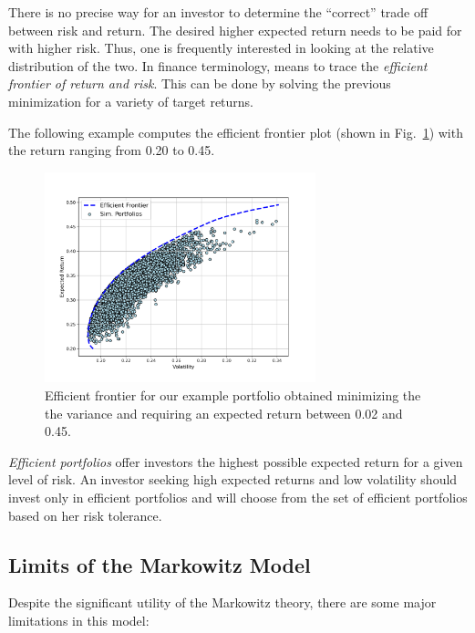 There is no precise way for an investor to determine the “correct” trade off between risk and return. The desired higher expected return needs to be paid for with higher risk. Thus, one is frequently interested in looking at the relative distribution of the two.
In finance terminology, means to trace the \emph{efficient frontier of return and risk}. This can be done by solving the previous minimization for a variety of target returns.

The following example computes the efficient frontier plot (shown in Fig.~\ref{fig:efficient_frontier}) with the return ranging from 0.20 to 0.45.


\begin{figure}[htb]
\centering
\includegraphics[width=0.7\textwidth]{figures/efficient_frontier}
\caption{Efficient frontier for our example portfolio obtained minimizing the the variance and requiring an expected return between 0.02 and 0.45.}
\label{fig:efficient_frontier}
\end{figure}

\emph{Efficient portfolios} offer investors the highest possible expected return for a given level of risk. 
An investor seeking high expected returns and low volatility should invest only in efficient portfolios and will choose from the set of efficient portfolios based on her risk tolerance.
    
\subsection{Limits of the Markowitz Model}
\label{limits-of-the-markowitz-model}

Despite the significant utility of the Markowitz theory, there are some major limitations in this model:

